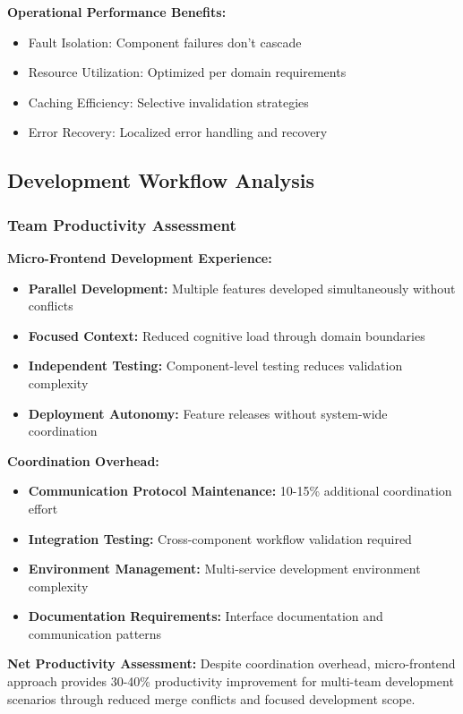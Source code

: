 \documentclass[12pt,a4paper]{report}
\begin{document}
\textbf{Operational Performance Benefits:}
\begin{itemize}
\item Fault Isolation: Component failures don't cascade
\item Resource Utilization: Optimized per domain requirements
\item Caching Efficiency: Selective invalidation strategies
\item Error Recovery: Localized error handling and recovery
\end{itemize}

\subsection{Development Workflow Analysis}

\subsubsection{Team Productivity Assessment}

\textbf{Micro-Frontend Development Experience:}
\begin{itemize}
\item \textbf{Parallel Development:} Multiple features developed simultaneously without conflicts
\item \textbf{Focused Context:} Reduced cognitive load through domain boundaries
\item \textbf{Independent Testing:} Component-level testing reduces validation complexity
\item \textbf{Deployment Autonomy:} Feature releases without system-wide coordination
\end{itemize}

\textbf{Coordination Overhead:}
\begin{itemize}
\item \textbf{Communication Protocol Maintenance:} 10-15\% additional coordination effort
\item \textbf{Integration Testing:} Cross-component workflow validation required
\item \textbf{Environment Management:} Multi-service development environment complexity
\item \textbf{Documentation Requirements:} Interface documentation and communication patterns
\end{itemize}

\textbf{Net Productivity Assessment:} Despite coordination overhead, micro-frontend approach provides 30-40\% productivity improvement for multi-team development scenarios through reduced merge conflicts and focused development scope.
\end{document}
